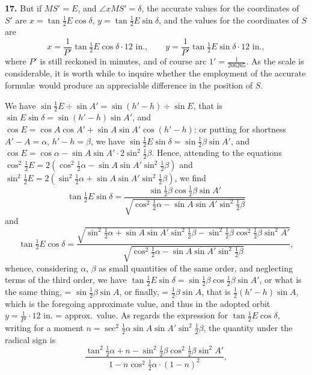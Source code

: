 \documentclass[11pt,a4paper]{article}
\begin{document}
\noindent\textbf{17.} But if $MS' = E$, and $\angle xMS' = \delta$, the accurate values for the coordinates of $S'$ are $x = \tan \tfrac{1}{2} E \cos \delta$, $y = \tan \tfrac{1}{2} E \sin \delta$, and the values for the coordinates of $S$ are
\[
x = \frac{1}{P'} \tan \tfrac{1}{2} E \cos \delta \cdot 12 \text{ in.}, \qquad y = \frac{1}{P'} \tan \tfrac{1}{2} E \sin \delta \cdot 12 \text{ in.},
\]
where $P'$ is still reckoned in minutes, and of course arc $1' = \tfrac{1}{206265}$. As the scale is considerable, it is worth while to inquire whether the employment of the accurate formul\ae\ would produce an appreciable difference in the position of $S$.

We have $\sin \tfrac{1}{2}E \div \sin A' = \sin(h' - h) \div \sin E$, that is $\sin E \sin \delta = \sin(h' - h) \sin A'$, and $\cos E = \cos A \cos A' + \sin A \sin A' \cos(h' - h)$: or putting for shortness $A' - A = \alpha$, $h' - h = \beta$, we have $\sin \tfrac{1}{2}E \sin \delta = \sin \tfrac{1}{2}\beta \sin A'$, and $\cos E = \cos \alpha - \sin A \sin A' \cdot 2\sin^{2}\tfrac{1}{2}\beta$. Hence, attending to the equations $\cos^{2}\tfrac{1}{2}E = 2(\cos^{2}\tfrac{1}{2}\alpha - \sin A \sin A' \sin^{2}\tfrac{1}{2}\beta)$ and $\sin^{2}\tfrac{1}{2}E = 2(\sin^{2}\tfrac{1}{2}\alpha + \sin A \sin A' \sin^{2}\tfrac{1}{2}\beta)$, we find
\[
\tan \tfrac{1}{2}E \sin \delta = \frac{\sin \tfrac{1}{2}\beta \cos \tfrac{1}{2}\beta \sin A'}{\sqrt{\cos^{2}\tfrac{1}{2}\alpha - \sin A \sin A' \sin^{2}\tfrac{1}{2}\beta}}
\]
and
\[
\tan \tfrac{1}{2}E \cos \delta = \frac{\sqrt{\sin^{2}\tfrac{1}{2}\alpha + \sin A \sin A' \sin^{2}\tfrac{1}{2}\beta - \sin^{2}\tfrac{1}{2}\beta \cos^{2}\tfrac{1}{2}\beta \sin^{2}A'}}{\sqrt{\cos^{2}\tfrac{1}{2}\alpha - \sin A \sin A' \sin^{2}\tfrac{1}{2}\beta}},
\]
whence, considering $\alpha$, $\beta$ as small quantities of the same order, and neglecting terms of the third order, we have $\tan \tfrac{1}{2}E \sin \delta = \sin \tfrac{1}{2}\beta \cos \tfrac{1}{2}\beta \sin A'$, or what is the same thing, = $\sin \tfrac{1}{2}\beta \sin A$, or finally, = $\tfrac{1}{2}\beta \sin A$, that is $\tfrac{1}{2}(h' - h) \sin A$, which is the foregoing approximate value, and thus in the adopted orbit $y = \tfrac{1}{P'} \cdot 12$ in. = approx.\ value. As regards the expression for $\tan \tfrac{1}{2}E \cos \delta$, writing for a moment $n = \sec^{2}\tfrac{1}{2}\alpha \sin A \sin A' \sin^{2}\tfrac{1}{2}\beta$, the quantity under the radical sign is
\[
\frac{\tan^{2}\tfrac{1}{2}\alpha + n - \sin^{2}\tfrac{1}{2}\beta \cos^{2}\tfrac{1}{2}\beta \sin^{2}A'}{1 - n \cos^{2}\tfrac{1}{2}\alpha \cdot (1-n)^{2}},
\]
\end{document}
